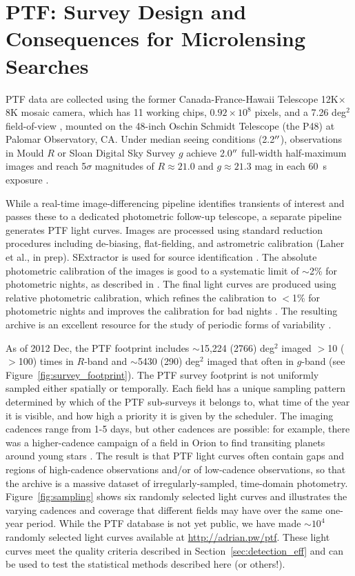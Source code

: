 \documentclass{emulateapj}
\begin{document}
\section{PTF: Survey Design and Consequences for Microlensing Searches}\label{sec:ptf} 
PTF data are collected using the former Canada-France-Hawaii Telescope 12K$\times$8K mosaic camera, which has 11 working chips, $0.92\times10^8$ pixels, and a 7.26 deg$^2$ field-of-view \citep{rahmer2008}, mounted on the 48-inch Oschin Schmidt Telescope (the P48) at Palomar Observatory, CA. Under median seeing conditions (2.2$\mbox{$^{\prime\prime}$}$), observations in Mould $R$ or Sloan Digital Sky Survey \citep[SDSS;][]{york00} $g$ achieve 2.0$\mbox{$^{\prime\prime}$}$ full-width half-maximum images and reach 5$\sigma$ magnitudes of $R \approx 21.0$ and $g \approx 21.3$ mag in each 60~s exposure \citep{nick2009,rau2009,nick2010}. 

While a real-time image-differencing pipeline identifies transients of interest and passes these to a dedicated photometric follow-up telescope, a separate pipeline generates PTF light curves. Images are processed using standard reduction procedures including de-biasing, flat-fielding, and astrometric calibration (Laher et al., in prep). SExtractor is used for source identification \citep{bertin96}. The absolute photometric calibration of the images is good to a systematic limit of $\sim$2\% for photometric nights, as described in \cite{ofek2012}.  The final light curves are produced using relative photometric calibration, which refines the calibration to $<$1\% for photometric nights and improves the calibration for bad nights \citep[Levitan et al., in prep; for algorithm details see][]{levitan2011, ofek2012}. The resulting archive is an excellent resource for the study of periodic forms of variability \citep[e.g., stellar or asteroid rotation;][]{agueros11,polishook2012}. 

As of 2012 Dec, the PTF footprint includes $\sim$15,224 (2766) deg$^2$ imaged $>$10 ($>$100) times in $R$-band and $\sim$5430 (290) deg$^2$ imaged that often in $g$-band (see Figure~\ref{fig:survey_footprint}). The PTF survey footprint is not uniformly sampled either spatially or temporally. Each field has a unique sampling pattern determined by which of the PTF sub-surveys it belongs to, what time of the year it is visible, and how high a priority it is given by the scheduler. The imaging cadences range from 1-5 days, but other cadences are possible: for example, there was a higher-cadence campaign of a field in Orion to find transiting planets around young stars \citep{vaneyken2011}. The result is that PTF light curves often contain gaps and regions of high-cadence observations and/or of low-cadence observations, so that the archive is a massive dataset of irregularly-sampled, time-domain photometry. Figure~\ref{fig:sampling} shows six randomly selected light curves and illustrates the varying cadences and coverage that different fields may have over the same one-year period. While the PTF database is not yet public, we have made $\sim$$10^4$ randomly selected light curves available at \url{http://adrian.pw/ptf}. These light curves meet the quality criteria described in Section~\ref{sec:detection_eff} and can be used to test the statistical methods described here (or others!).
\end{document}

